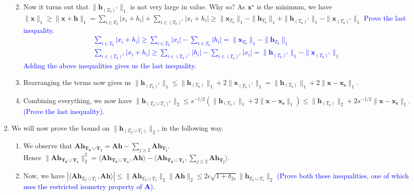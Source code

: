 \documentclass[11pt]{article}
\begin{document}
\begin{enumerate}
\begin{enumerate}
\begin{enumerate}
{}
\item Now it turns out that $\|\mathbf{h}_{(T_0)^c}\|_1$ is not very large in value. Why so? As $\mathbf{x}^{\star}$ is the minimum, we have $\|\mathbf{x}\|_1 \geq \|\mathbf{x}+\mathbf{h}\|_1 = \sum_{i \in T_0} |x_i + h_i| + \sum_{i \in {(T_0)}^c} |x_i + h_i| \geq \|\mathbf{x}_{T_0}\|_1 - \|\mathbf{h}_{T_0}\|_1 + \|\mathbf{h}_{{(T_0)}^c}\|_1 - \|\mathbf{x}_{{(T_0)^c}}\|_1$ \textcolor{blue}{Prove the last inequality}. \\
\textcolor{blue}{
\begin{gather*}
\sum_{i \in T_0} |x_i + h_i| \geq \sum_{i \in T_0}|x_i| - \sum_{i \in T_0}|h_i| = \|\mathbf{x}_{T_0}\|_1 - \|\mathbf{h}_{T_0}\|_1\\
\sum_{i \in {(T_0)}^c} |x_i + h_i| \geq \sum_{i \in {(T_0)}^c}|h_i| - \sum_{i \in {(T_0)}^c}|x_i| = \|\mathbf{h}_{{(T_0)}^c}\|_1 - \|\mathbf{x}_{{(T_0)^c}}\|_1
\end{gather*}
Adding the above inequalities gives us the last inequality.
}
\item Rearranging the terms now gives us $\|\mathbf{h}_{{(T_0)}^c}\|_1 \leq \|\mathbf{h}_{{(T_0)}}\|_1  + 2\|\mathbf{x}_{{(T_0)^c}}\|_1 = \|\mathbf{h}_{{(T_0)}}\|_1  + 2\|\mathbf{x}-\mathbf{x_s}\|_1$. 
\item Combining everything, we now have $\|\mathbf{h}_{(T_0 \cup T_1)^c}\|_2 \leq s^{-1/2}(\|\mathbf{h}_{{(T_0)}}\|_1  + 2\|\mathbf{x}-\mathbf{x_s}\|_1) \leq \|\mathbf{h}_{{(T_0)}}\|_2 + 2s^{-1/2} \|\mathbf{x}-\mathbf{x_s}\|_1$. \textcolor{blue}{(Prove the last inequality).}
\end{enumerate}
\item We will now prove the bound on $\|\mathbf{h}_{(T_0 \cup T_1)}\|_2$, in the following way. 
\begin{enumerate}
\item We observe that $\mathbf{Ah_{T_0 \cup T_1}} = \mathbf{Ah} - \sum_{j \geq 2} \mathbf{Ah_{T_j}}$. \\
Hence $\|\mathbf{Ah_{T_0 \cup T_1}}\|^2_2 = \langle \mathbf{Ah_{T_0 \cup T_1}} , \mathbf{Ah}\rangle - \langle \mathbf{Ah_{T_0 \cup T_1}} , \sum_{j \geq 2} \mathbf{Ah_{T_j}}\rangle$.
\item Now, we have $|\langle \mathbf{Ah}_{T_0 \cup T_1} , \mathbf{Ah}\rangle| \leq \|\mathbf{Ah}_{T_0 \cup T_1}\|_2 \|\mathbf{Ah}\|_2 \leq 2 \epsilon \sqrt{1 + \delta_{2s}} \|\mathbf{h}_{T_0 \cup T_1}\|_2$ \textcolor{blue}{(Prove both these inequalities, one of which uses the restricted isometry property of $\mathbf{A}$)}. 

\end{enumerate}
\end{enumerate}
\end{enumerate}
\end{document}
